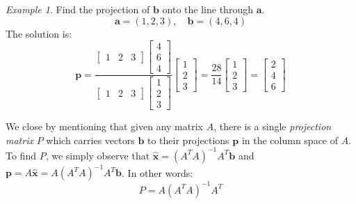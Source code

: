 \documentclass[11pt,oneside]{amsbook}
\theoremstyle{definition}
\theoremstyle{plain}
\theoremstyle{definition}
\theoremstyle{remark}
\newtheorem{example}[theorem]{Example}
\numberwithin{equation}{section}
\numberwithin{figure}{section}
\begin{document}
\begin{example}
  Find the projection of $\mathbf{b}$ onto the line through $\mathbf{a}$.
  \[\mathbf{a}=(1,2,3),\quad \mathbf{b}=(4,6,4)
  \]
  The solution is:
  \[\mathbf{p}=\frac{\begin{bmatrix}1&2&3\end{bmatrix}
  \begin{bmatrix}4\\6\\4\end{bmatrix}}
  {\begin{bmatrix}1&2&3\end{bmatrix}\begin{bmatrix}1\\2\\3\end{bmatrix}}
  \begin{bmatrix}1\\2\\3\end{bmatrix}
  =\frac{28}{14}\begin{bmatrix}1\\2\\3\end{bmatrix}
  =\begin{bmatrix}2\\4\\6\end{bmatrix}
  \]
\end{example}

We close by mentioning that given any matrix $A$, there is a single \emph{projection matrix} $P$ which carries vectors $\mathbf{b}$ to their projections $\mathbf{p}$ in the column space of $A$. To find $P$, we simply observe that $\hat{\mathbf{x}}=(A^TA)^{-1}A^T\mathbf{b}$ and $\mathbf{p}=A\hat{\mathbf{x}}=A(A^TA)^{-1}A^T\mathbf{b}$. In other words:
\[P=A(A^TA)^{-1}A^T
\]
\end{document}
